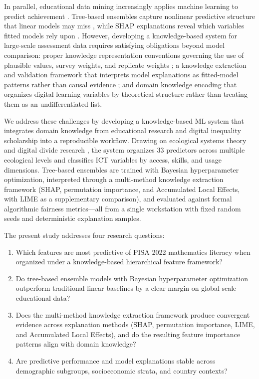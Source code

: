 \documentclass[review,12pt]{elsarticle}
\begin{document}
In parallel, educational data mining increasingly applies machine learning to predict achievement \citep{Romero_Ventura_2020}. Tree-based ensembles capture nonlinear predictive structure that linear models may miss \citep{Breiman_2001}, while SHAP explanations reveal which variables fitted models rely upon \citep{Lundberg_Lee_2017}. However, developing a knowledge-based system for large-scale assessment data requires satisfying obligations beyond model comparison: proper knowledge representation conventions governing the use of plausible values, survey weights, and replicate weights \citep{OECD_2022_technical,Rutkowski_2010}; a knowledge extraction and validation framework that interprets model explanations as fitted-model patterns rather than causal evidence \citep{Rudin_2019,Molnar_2022}; and domain knowledge encoding that organizes digital-learning variables by theoretical structure rather than treating them as an undifferentiated list.

We address these challenges by developing a knowledge-based ML system that integrates domain knowledge from educational research and digital inequality scholarship into a reproducible workflow. Drawing on ecological systems theory \citep{Bronfenbrenner_1979} and digital divide research \citep{van_Dijk_2020}, the system organizes 33 predictors across multiple ecological levels and classifies ICT variables by access, skills, and usage dimensions. Tree-based ensembles are trained with Bayesian hyperparameter optimization, interpreted through a multi-method knowledge extraction framework (SHAP, permutation importance, and Accumulated Local Effects, with LIME as a supplementary comparison), and evaluated against formal algorithmic fairness metrics---all from a single workstation with fixed random seeds and deterministic explanation samples.

The present study addresses four research questions:

\begin{enumerate}
\item Which features are most predictive of PISA 2022 mathematics literacy when organized under a knowledge-based hierarchical feature framework?
\item Do tree-based ensemble models with Bayesian hyperparameter optimization outperform traditional linear baselines by a clear margin on global-scale educational data?
\item Does the multi-method knowledge extraction framework produce convergent evidence across explanation methods (SHAP, permutation importance, LIME, and Accumulated Local Effects), and do the resulting feature importance patterns align with domain knowledge?
\item Are predictive performance and model explanations stable across demographic subgroups, socioeconomic strata, and country contexts?
\end{enumerate}
\end{document}
